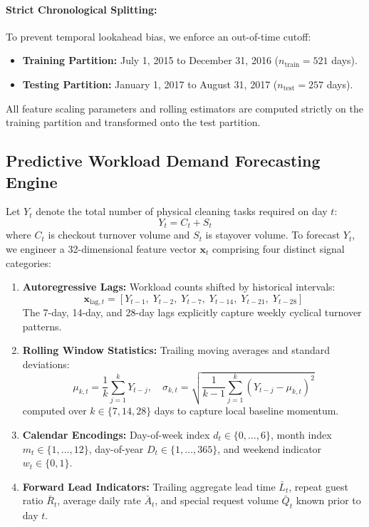\documentclass[11pt,a4paper]{article}
\begin{document}
\paragraph{Strict Chronological Splitting:} To prevent temporal lookahead bias, we enforce an out-of-time cutoff:
\begin{itemize}
    \item \textbf{Training Partition:} July 1, 2015 to December 31, 2016 ($n_{\text{train}} = 521$ days).
    \item \textbf{Testing Partition:} January 1, 2017 to August 31, 2017 ($n_{\text{test}} = 257$ days).
\end{itemize}
All feature scaling parameters and rolling estimators are computed strictly on the training partition and transformed onto the test partition.

\subsection{Predictive Workload Demand Forecasting Engine}
Let $Y_t$ denote the total number of physical cleaning tasks required on day $t$:
\begin{equation}
Y_t = C_t + S_t
\end{equation}
where $C_t$ is checkout turnover volume and $S_t$ is stayover volume. To forecast $Y_t$, we engineer a 32-dimensional feature vector $\mathbf{x}_t$ comprising four distinct signal categories:
\begin{enumerate}
    \item \textbf{Autoregressive Lags:} Workload counts shifted by historical intervals:
    \begin{equation}
    \mathbf{x}_{\text{lag}, t} = \left[Y_{t-1}, \; Y_{t-2}, \; Y_{t-7}, \; Y_{t-14}, \; Y_{t-21}, \; Y_{t-28}\right]
    \end{equation}
    The 7-day, 14-day, and 28-day lags explicitly capture weekly cyclical turnover patterns.
    \item \textbf{Rolling Window Statistics:} Trailing moving averages and standard deviations:
    \begin{equation}
    \mu_{k, t} = \frac{1}{k}\sum_{j=1}^{k} Y_{t-j}, \quad \sigma_{k, t} = \sqrt{\frac{1}{k-1}\sum_{j=1}^{k} (Y_{t-j} - \mu_{k, t})^2}
    \end{equation}
    computed over $k \in \{7, 14, 28\}$ days to capture local baseline momentum.
    \item \textbf{Calendar Encodings:} Day-of-week index $d_t \in \{0, \dots, 6\}$, month index $m_t \in \{1, \dots, 12\}$, day-of-year $D_t \in \{1, \dots, 365\}$, and weekend indicator $w_t \in \{0, 1\}$.
    \item \textbf{Forward Lead Indicators:} Trailing aggregate lead time $\bar{L}_t$, repeat guest ratio $\bar{R}_t$, average daily rate $\bar{A}_t$, and special request volume $\bar{Q}_t$ known prior to day $t$.
\end{enumerate}
\end{document}
